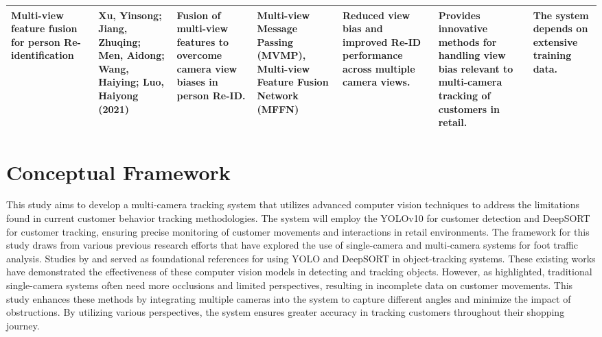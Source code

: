{\begin{landscape}
\begin{longtable}{|p{2.5cm}|p{2.5cm}|p{2.7cm}|p{2.7cm}|p{2.5cm}|p{2.5cm}|p{2.5cm}|}
		Multi-view feature fusion for person Re-identification
		& Xu, Yinsong; Jiang, Zhuqing; Men, Aidong; Wang, Haiying; Luo, Haiyong (2021)
		& Fusion of multi-view features to overcome camera view biases in person Re-ID.
		& Multi-view Message Passing (MVMP), Multi-view Feature Fusion Network (MFFN)
		& Reduced view bias and improved Re-ID performance across multiple camera views.
		& Provides innovative methods for handling view bias relevant to multi-camera tracking of customers in retail.
		& The system depends on extensive training data.\\
		\hline
	\end{longtable}
\end{landscape}

\section{Conceptual Framework}
This study aims to develop a multi-camera tracking system that utilizes advanced computer vision techniques to address the limitations found in current customer behavior tracking methodologies. The system will employ the YOLOv10 for customer detection and DeepSORT for customer tracking, ensuring precise monitoring of customer movements and interactions in retail environments. The framework for this study draws from various previous research efforts that have explored the use of single-camera and multi-camera systems for foot traffic analysis. Studies by \cite{Xie2024} and \cite{Chen2022} served as foundational references for using YOLO and DeepSORT in object-tracking systems. These existing works have demonstrated the effectiveness of these computer vision models in detecting and tracking objects. However, as \cite{Cabahug2023} highlighted, traditional single-camera systems often need more occlusions and limited perspectives, resulting in incomplete data on customer movements. This study enhances these methods by integrating multiple cameras into the system to capture different angles and minimize the impact of obstructions. By utilizing various perspectives, the system ensures greater accuracy in tracking customers throughout their shopping journey.

}
